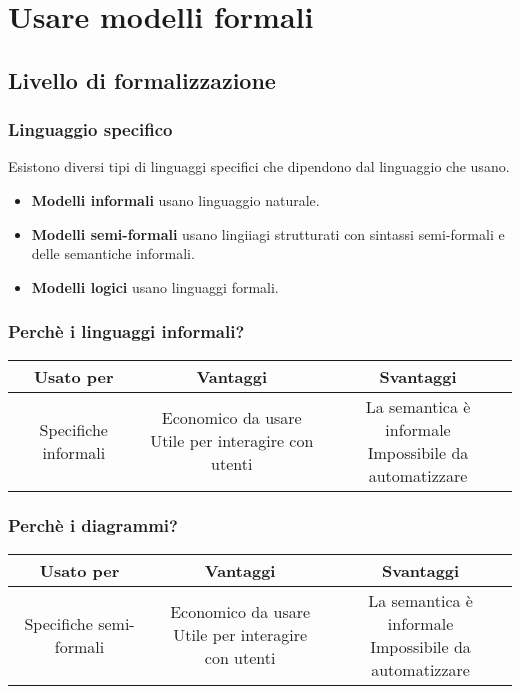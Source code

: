 \documentclass[../main.tex]{subfiles}
\begin{document}
    \chapter{Usare modelli formali}
    \section{Livello di formalizzazione}
    \subsection{Linguaggio specifico}
    Esistono diversi tipi di linguaggi specifici che dipendono dal linguaggio che usano.
    \begin{itemize}
        \item \textbf{Modelli informali} usano linguaggio naturale.
        \item \textbf{Modelli semi-formali} usano lingiiagi strutturati con sintassi semi-formali e delle semantiche informali.
        \item \textbf{Modelli logici} usano linguaggi formali.
    \end{itemize}

    \subsection{Perchè i linguaggi informali?}
    \begin{center}
        \begin{tabular}{|c|c|c|}
            \hline
            Usato per & Vantaggi & Svantaggi\\
            \hline
            Specifiche informali & \makecell{Economico da usare\\ Utile per interagire con utenti} & \makecell{La semantica è informale\\ Impossibile da automatizzare}\\
            \hline
        \end{tabular}
    \end{center}

    \subsection{Perchè i diagrammi?}
    \begin{center}
        \begin{tabular}{|c|c|c|}
            \hline
            Usato per & Vantaggi & Svantaggi\\
            \hline
            Specifiche semi-formali & \makecell{Economico da usare\\ Utile per interagire con utenti} & \makecell{La semantica è informale\\ Impossibile da automatizzare}\\
            \hline
        \end{tabular}
    \end{center}
\end{document}
